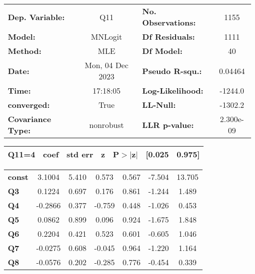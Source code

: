 \begin{center}
\begin{tabular}{lclc}
\toprule
\textbf{Dep. Variable:}   &       Q11        & \textbf{  No. Observations:  } &     1155    \\
\textbf{Model:}           &     MNLogit      & \textbf{  Df Residuals:      } &     1111    \\
\textbf{Method:}          &       MLE        & \textbf{  Df Model:          } &       40    \\
\textbf{Date:}            & Mon, 04 Dec 2023 & \textbf{  Pseudo R-squ.:     } &  0.04464    \\
\textbf{Time:}            &     17:18:05     & \textbf{  Log-Likelihood:    } &   -1244.0   \\
\textbf{converged:}       &       True       & \textbf{  LL-Null:           } &   -1302.2   \\
\textbf{Covariance Type:} &    nonrobust     & \textbf{  LLR p-value:       } & 2.300e-09   \\
\bottomrule
\end{tabular}
\begin{tabular}{ccccccc}
 \textbf{Q11=4}  & \textbf{coef} & \textbf{std err} & \textbf{z} & \textbf{P$> |$z$|$} & \textbf{[0.025} & \textbf{0.975]}  \\
\midrule
\bottomrule
\end{tabular}
\begin{tabular}{lcccccc}
\textbf{const}   &       3.1004  &        5.410     &     0.573  &         0.567        &       -7.504    &       13.705     \\
\textbf{Q3}      &       0.1224  &        0.697     &     0.176  &         0.861        &       -1.244    &        1.489     \\
\textbf{Q4}      &      -0.2866  &        0.377     &    -0.759  &         0.448        &       -1.026    &        0.453     \\
\textbf{Q5}      &       0.0862  &        0.899     &     0.096  &         0.924        &       -1.675    &        1.848     \\
\textbf{Q6}      &       0.2204  &        0.421     &     0.523  &         0.601        &       -0.605    &        1.046     \\
\textbf{Q7}      &      -0.0275  &        0.608     &    -0.045  &         0.964        &       -1.220    &        1.164     \\
\textbf{Q8}      &      -0.0576  &        0.202     &    -0.285  &         0.776        &       -0.454    &        0.339     \\

\end{tabular}
\end{center}

